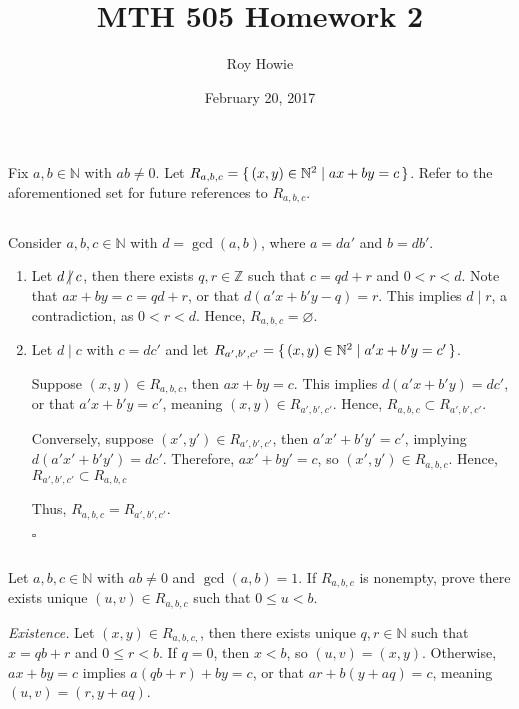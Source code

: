 \documentclass{article}
\newcommand{\N}{\mathbb{N}}
\newcommand{\Z}{\mathbb{Z}}
\begin{document}
\title{MTH 505 Homework 2}
\author{Roy Howie}
\date{February 20, 2017}
\maketitle

Fix $a,b\in\N$ with $ab\ne0$. Let $R_{a,b,c}=\set{(x,y)\in\N^2\mid ax+by=c}$.
Refer to the aforementioned set for future references to $R_{a,b,c}$.

\subsection{} %
  Consider $a,b,c\in\N$ with $d=\gcd(a,b)$, where $a=da'$ and $b=db'$.
  \begin{enumerate}[label=\textbf{(\alph*)}]
    \item{
      Let $d\centernot\mid c$, then there exists $q,r\in\Z$ such that $c=qd+r$
      and $0<r<d$. Note that $ax+by=c=qd+r$, or that $d(a'x+b'y-q)=r$. This
      implies $d\mid r$, a contradiction, as $0<r<d$. Hence, $R_{a,b,c}=
      \varnothing$.
    }
    \item{
      Let $d\mid c$ with $c=dc'$ and let $R_{a',b',c'}=\set{(x,y)\in\N^2\mid
      a'x+b'y=c'}$.

      Suppose $(x,y)\in R_{a,b,c}$, then $ax+by=c$. This implies
      $d(a'x+b'y)=dc'$, or that $a'x+b'y=c'$, meaning $(x,y)\in R_{a',b',c'}$.
      Hence, $R_{a,b,c}\subset R_{a',b',c'}$.

      Conversely, suppose $(x',y')\in R_{a',b',c'}$, then $a'x'+b'y'=c'$,
      implying $d(a'x'+b'y')=dc'$. Therefore, $ax'+by'=c$, so
      $(x',y')\in R_{a,b,c}$. Hence, $R_{a',b',c'}\subset R_{a,b,c}$

      Thus, $R_{a,b,c}=R_{a',b',c'}$.
    }
    \hfill $\square$
  \end{enumerate}

\subsection{} %
  Let $a,b,c\in\N$ with $ab\ne0$ and $\gcd(a,b)=1$. If $R_{a,b,c}$ is nonempty,
  prove there exists unique $(u,v)\in R_{a,b,c}$ such that $0\leq u<b$.

  \textit{Existence.}
  Let $(x,y)\in R_{a,b,c,}$, then there exists unique $q,r\in\N$ such that
  $x=qb+r$ and $0\leq r<b$. If $q=0$, then $x<b$, so $(u,v)=(x,y)$. Otherwise,
  $ax+by=c$ implies $a(qb+r)+by=c$, or that $ar+b(y+aq)=c$, meaning
  $(u,v)=(r,y+aq)$.
\end{document}
